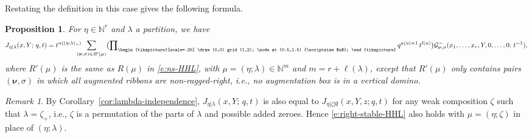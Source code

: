 \documentclass[12pt]{amsart}
\newtheorem{prop}[thm]{Proposition}
\theoremstyle{definition}
\theoremstyle{remark}
\newtheorem{remark}[thm]{Remark}
\newcommand{\NN}{{\mathbb N}}
\newcommand{\nubold}{{\boldsymbol \nu }}
\newcommand{\Gcal}{{\mathcal G}}
\newcommand{\domino}{\begin{tikzpicture}[scale=.25]
\draw (0,0) grid (1,2);
\node at (0.5,1.5) {\scriptsize $u$};
\end{tikzpicture}}
\newcommand{\Jns}{J}           %
\begin{document}
Restating the definition in this case gives the following formula.

\begin{prop}\label{prop:right-stable-HHL}
For $\eta \in \NN ^{r}$ and $\lambda $ a partition, we have
\begin{equation}\label{e:right-stable-HHL}
\Jns _{\eta |\lambda }(x,Y;\, q,t) = t^{n((\eta ;\lambda) _{+})}
\hspace{-2ex} \sum _{(\nubold ,\sigma )\in R'(\mu )} \bigl( \prod
\nolimits_{\domino } q^{a(u)+1}\, t^{l(u)} \bigr) \Gcal _{\nubold
,\sigma }^{-}(x_{1}, \ldots, x_{r}, Y, 0,\ldots,0;\, t^{-1}),
\end{equation}
where $R'(\mu )$ is the same as $R(\mu )$ in \eqref{e:ns-HHL}, with
$\mu =(\eta ;\lambda)\in \NN ^{m}$ and $m=r+\ell(\lambda)$, except
that $R'(\mu )$ only contains pairs $(\nubold ,\sigma )$ in which all
augmented ribbons are non-ragged-right, i.e., no augmentation box is
in a vertical domino.
\end{prop}

\begin{remark}\label{rem:rearranging-lambda}
By Corollary~\ref{cor:lambda-independence}, $\Jns _{\eta |\lambda }(x,Y;\,
q,t)$ is also equal to $\Jns _{\eta |\zeta | \emptyset}(x,Y,z;q,t)$ for
any weak composition $\zeta $ such that $\lambda =\zeta _{+}$, i.e.,
$\zeta $ is a permutation of the parts of $\lambda $ and possible
added zeroes.  Hence \eqref{e:right-stable-HHL} also holds with $\mu
=(\eta ;\zeta )$ in place of $(\eta ;\lambda )$.
\end{remark}
\end{document}
